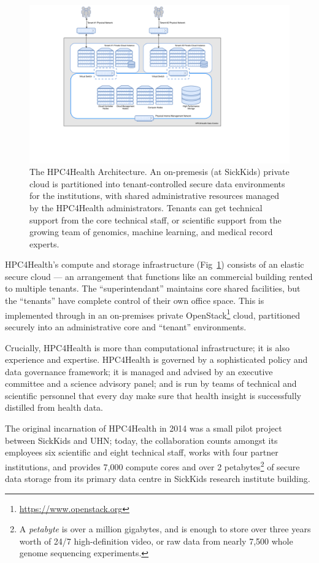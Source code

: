 \documentclass[twoside,symmetric,sfsidenotes,notoc]{tufte-book}
\begin{document}
\begin{figure}
  \includegraphics{HPC4Health_1.pdf}
  \caption[HPC4Health Architecture Diagram]{The HPC4Health Architecture.  An on-premesis (at SickKids) private
  cloud is partitioned into tenant-controlled secure data environments for the institutions, with shared administrative
  resources managed by the HPC4Health administrators.  Tenants can get technical support from the core
  technical staff, or scientific support from the growing team of genomics, machine learning, and
  medical record experts. }
  \label{fig:hpc4health-architecture}
\end{figure}

HPC4Health's compute and storage infrastructure (Fig~\ref{fig:hpc4health-architecture})
consists of an elastic secure cloud --- an arrangement that functions like an commercial building
rented to multiple tenants.  The ``superintendant'' maintains core shared facilities, but
the ``tenants'' have complete control of their own office space.   This is implemented through
in an on-premises private OpenStack\footnote{\url{https://www.openstack.org}} cloud,
partitioned securely into an administrative core and ``tenant'' environments.

Crucially, HPC4Health is more than computational infrastructure;  it is also
experience and expertise.  HPC4Health is governed by a sophisticated
policy and data governance framework; it is managed and advised by an executive committee
and a science advisory panel; and is run by teams of technical and scientific
personnel that every day make sure that health insight is successfully distilled from
health data.

The original incarnation of HPC4Health in 2014 was a small pilot project between
SickKids and UHN; today, the collaboration counts amongst its employees six scientific 
and eight technical staff, works with four partner institutions, and provides 7,000
compute cores and over 2 petabytes\footnote{A \textit{petabyte} is over a million gigabytes,
and is enough to store over three years worth of 24/7 high-definition video, or 
raw data from nearly 7,500 whole genome sequencing experiments.} of secure data storage
from its primary data centre in SickKids research institute building.
\end{document}
